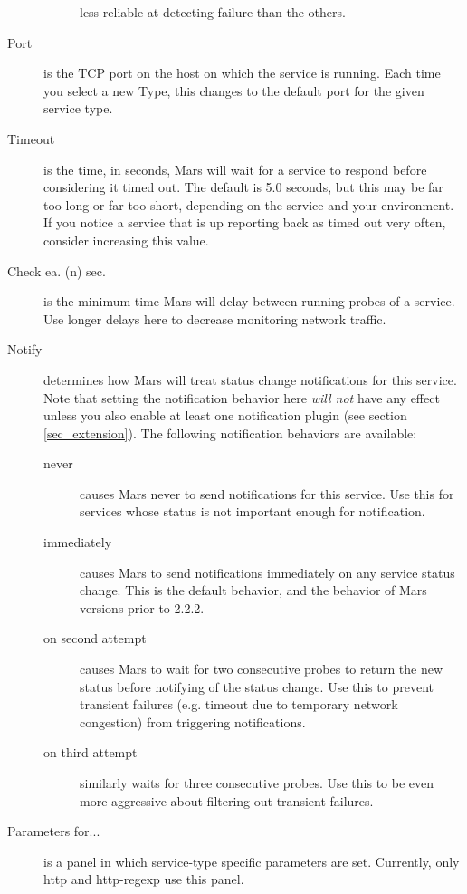 \documentclass{article}
\newcommand{\guiitem}[1]{{\sf #1}}
\begin{document}
\begin{description}
\begin{description}
  less reliable at detecting failure than the others.
\end{description}
\item[Port] is the TCP port on the host on which the service is
  running.  Each time you select a new \guiitem{Type}, this changes to
  the default port for the given service type.
\item[Timeout] is the time, in seconds, Mars will wait for a service
  to respond before considering it timed out. The default is 5.0
  seconds, but this may be far too long or far too short, depending on
  the service and your environment. If you notice a service that is up
  reporting back as timed out very often, consider increasing this
  value.
\item[Check ea. (n) sec.] is the minimum time Mars will delay between
  running probes of a service. Use longer delays here to decrease
  monitoring network traffic.
\item[Notify] determines how Mars will treat status change
  notifications for this service. Note that setting the notification
  behavior here {\em will not} have any effect unless you also enable
  at least one notification plugin (see section
  \ref{sec_extension}). The following notification behaviors are
  available:
\begin{description}
\item[never] causes Mars never to send notifications for this
  service. Use this for services whose status is not important enough
  for notification.
\item[immediately] causes Mars to send notifications immediately on
  any service status change. This is the default behavior, and the
  behavior of Mars versions prior to 2.2.2.
\item[on second attempt] causes Mars to wait for two consecutive
  probes to return the new status before notifying of the status
  change. Use this to prevent transient failures (e.g. timeout due to
  temporary network congestion) from triggering notifications.
\item[on third attempt] similarly waits for three consecutive
  probes. Use this to be even more aggressive about filtering out
  transient failures.
\end{description}
\item[Parameters for...] is a panel in which service-type specific
  parameters are set. Currently, only \guiitem{http} and
  \guiitem{http-regexp} use this panel.
\end{description}
\end{document}

